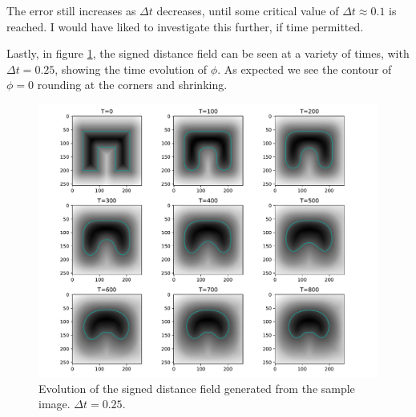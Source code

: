\documentclass[sigconf]{acmart}
\begin{document}
The error still increases as $ \Delta t $ decreases, until some critical value of $ \Delta t \approx 0.1$ is reached. I would have liked to investigate this further, if time permitted.



Lastly, in figure \ref{fig:mcf_evol}, the signed distance field can be seen at a variety of times, with $ \Delta t=0.25 $, showing the time evolution of $ \phi $. As expected we see the contour of $ \phi=0 $ rounding at the corners and shrinking.
\begin{figure}
	\includegraphics[width=\linewidth]{mean_curvature_evol.pdf}
	\caption{Evolution of the signed distance field generated from the sample image. $ \Delta t = 0.25 $.}
	\label{fig:mcf_evol}
\end{figure}
\end{document}
